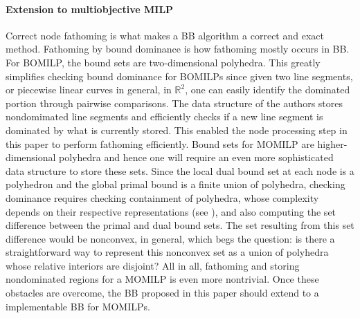 \documentclass[11.5pt]{article}
\newcommand{\bb}{BB}
\newcommand{\R}{\mathbb{R}}
\begin{document}
%
\paragraph{Extension to multiobjective MILP}
Correct node fathoming is what makes a \bb{} algorithm a correct and exact method. Fathoming by bound dominance is how fathoming mostly occurs in \bb{}. For BOMILP, the bound sets are two-dimensional polyhedra. This greatly simplifies checking bound dominance for BOMILPs since given two line segments, or piecewise linear curves in general, in $\R^{2}$, one can easily identify the dominated portion through pairwise comparisons. The data structure \citep{treestructure} of the authors stores nondomimated line segments and efficiently checks if a new line segment is dominated by what is currently stored. This enabled the node processing step in this paper to perform fathoming efficiently. Bound sets for MOMILP are higher-dimensional polyhedra and hence one will require an even more sophisticated data structure to store these sets. Since the local dual bound set at each node is a polyhedron and the global primal bound is a finite union of polyhedra, checking dominance requires checking containment of polyhedra, whose complexity depends on their respective representations (see \citep{freund1985complexity,gritzmann1994complexity}), and also computing the set difference between the primal and dual bound sets. The set resulting from this set difference would be nonconvex, in general, which begs the question: is there a straightforward way to represent this nonconvex set as a union of polyhedra whose relative interiors are disjoint?  All in all, fathoming and storing nondominated regions for a MOMILP is even more nontrivial. Once these obstacles are overcome, the \bb{} proposed in this paper should extend to a implementable \bb{} for MOMILPs.

\end{document}
